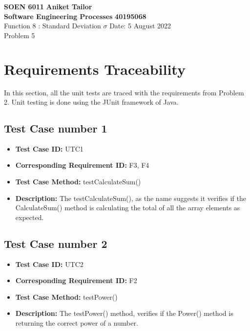 \documentclass[a4paper, 12pt]{article}
\begin{document}
\noindent
\large\textbf{SOEN 6011} \hfill \textbf{Aniket Tailor}\\
\large\textbf{Software Engineering Processes} \hfill \textbf{40195068} \\
Function 8 : Standard Deviation $\sigma$ \hfill Date: 5 August 2022\\
\normalsize Problem 5 \\


\section*{Requirements Traceability}
In this section, all the unit tests are traced with the requirements from Problem 2. Unit testing is done using the JUnit framework of Java. 

\subsection*{Test Case number 1}
    \begin{itemize}
        \item \textbf{Test Case ID: } UTC1
        \item \textbf{Corresponding Requirement ID: } F3, F4
        \item \textbf{Test Case Method: } testCalculateSum()
        \item \textbf{Description: } The testCalculateSum(), as the name suggests it verifies if the CalculateSum() method is calculating the total of all the array elements as expected. 
    \end{itemize}
    
\subsection*{Test Case number 2}
    \begin{itemize}
        \item \textbf{Test Case ID: } UTC2
        \item \textbf{Corresponding Requirement ID: } F2
        \item \textbf{Test Case Method: } testPower()
        \item \textbf{Description: } The testPower() method, verifies if the Power() method is returning the correct power of a number. 
    \end{itemize}
    
\end{document}
